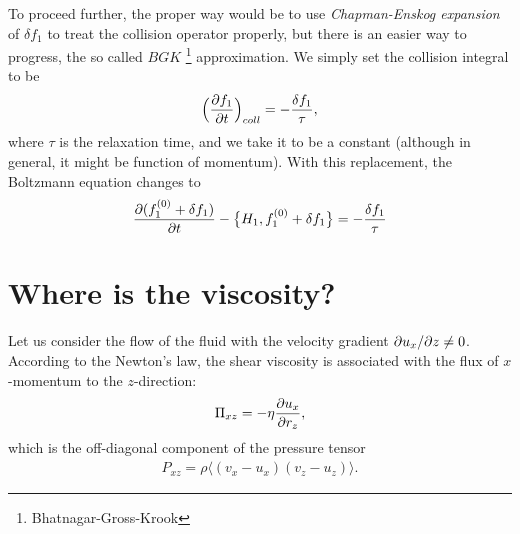 To proceed further, the proper way would be to use \textit{Chapman-Enskog expansion} of $\delta f_1$ to treat the collision operator properly, but there is an easier way to progress, the so called $BGK$ \footnote{Bhatnagar-Gross-Krook} approximation. We simply set the collision integral to be
\begin{align} \label{bgk}
\Big( \frac{\partial f_1}{\partial t} \Big)_{coll} = - \frac{\delta f_1}{\tau},
\end{align}
where $\tau$ is the relaxation time, and we take it to be a constant (although in general, it might be function of momentum).
With this replacement, the Boltzmann equation changes to
\begin{align*}
\frac{\partial (f_1^{(0)} + \delta f_1)}{\partial t} - \big\{ H_1, f_1^{(0)} + \delta f_1 \big\} = -\frac{\delta f_1}{\tau}
\end{align*}

\section{Where is the viscosity?}
Let us consider the flow of the fluid with the velocity gradient $\partial u_x / \partial z \neq 0$.
According to the Newton's law, the shear viscosity is associated with the flux of $x$-momentum to the $z$-direction:
\begin{align} \label{newt}
\Pi_{xz} = -\eta \frac{\partial u_x}{\partial r_z},
\end{align}
which is the off-diagonal component of the pressure tensor
\begin{align*}
P_{xz} = \rho \langle (v_x - u_x) (v_z - u_z) \rangle.
\end{align*}

